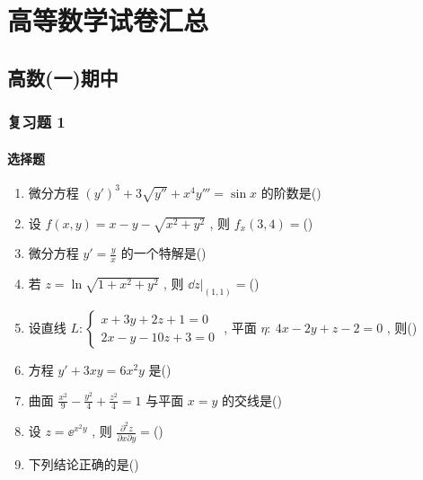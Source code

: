 \chapter{高等数学试卷汇总}

\section{高数(一)期中}

\subsection{复习题 1}
\subsubsection{选择题}
\begin{enumerate}
	\item 微分方程 $(y')^3+3\sqrt{y''}+x^4y'''=\sin x$ 的阶数是(\hspace{1pc})
	\item 设 $f(x,y)=x-y-\sqrt{x^2+y^2}$ , 则 $f_{x}(3,4)=$(\hspace{1pc})
	\item 微分方程 $y'=\frac{y}{x}$ 的一个特解是(\hspace{1pc})
	\item 若 $z=\ln\sqrt{1+x^2+y^2}$ , 则 $\left.\dd z\right|_{(1,1)}=$(\hspace{1pc})
	\item 设直线 $L:\begin{cases}
	x+3y+2z+1=0\\
	2x-y-10z+3=0
	\end{cases}$ , 平面 $\eta:\ 4x-2y+z-2=0$ , 则(\hspace{1pc})
	\item 方程 $y'+3xy=6x^2y$ 是(\hspace{1pc})
	\item 曲面 $\frac{x^2}{9}-\frac{y^2}{4}+\frac{z^2}{4}=1$ 与平面 $x=y$ 的交线是(\hspace{1pc})
	\item 设 $z=\ee^{x^2y}$ , 则 $\frac{\partial^2z}{\partial x\partial y}=$(\hspace{1pc})
	\item 下列结论正确的是(\hspace{1pc})
\end{enumerate}

